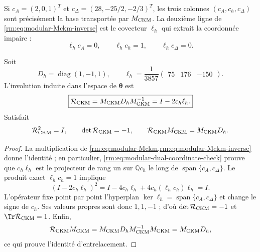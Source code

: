 Si \(c_A=(2,0,1)^T\) et
\(c_\Delta=(28,-25/2,-2/3)^T\), les trois colonnes
\((c_A,c_h,c_\Delta)\) sont précisément la base transportée par
\(M_{\rm CKM}\). La deuxième ligne de
\cref{rm:eq:modular-Mckm-inverse} est le covecteur \(\ell_h\) qui extrait la
coordonnée impaire :
\begin{equation}
\label{rm:eq:modular-dual-coordinate-check}
\ell_hc_A=0,
\qquad
\ell_hc_h=1,
\qquad
\ell_hc_\Delta=0.
\end{equation}

\begin{theorem}
\label{rm:thm:modular-ckm-reflection}
Soit
\begin{equation}
\label{rm:eq:modular-Dh-lh}
D_h=\operatorname{diag}(1,-1,1),
\qquad
\ell_h=\frac1{3857}\begin{pmatrix}75&176&-150\end{pmatrix}.
\end{equation}
L'involution induite dans l'espace de \(\boldsymbol\theta\) est
\begin{equation}
\label{rm:eq:modular-Rckm}
\boxed{
\mathcal R_{\rm CKM}
=M_{\rm CKM}D_hM_{\rm CKM}^{-1}
=I-2c_h\ell_h.}
\end{equation}
Satisfait
\begin{equation}
\label{rm:eq:modular-Rckm-properties}
\mathcal R_{\rm CKM}^2=I,
\qquad
\det\mathcal R_{\rm CKM}=-1,
\qquad
\mathcal R_{\rm CKM}M_{\rm CKM}=M_{\rm CKM}D_h.
\end{equation}
\end{theorem}

\begin{proof}
La multiplication de
\cref{rm:eq:modular-Mckm,rm:eq:modular-Mckm-inverse} donne l'identité ; en
particulier, \cref{rm:eq:modular-dual-coordinate-check} prouve que
\(c_h\ell_h\) est le projecteur de rang un sur \(\mathbb Qc_h\) le
long de \(\operatorname{span}\{c_A,c_\Delta\}\). Le produit exact
\(\ell_hc_h=1\) implique
\[
(I-2c_h\ell_h)^2
=I-4c_h\ell_h+4c_h(\ell_hc_h)\ell_h=I.
\]
L'opérateur fixe point par point l'hyperplan
\(\ker\ell_h=\operatorname{span}\{c_A,c_\Delta\}\) et change le signe de
\(c_h\). Ses valeurs propres sont donc \(1,1,-1\) ; d'où
\(\det\mathcal R_{\rm CKM}=-1\) et
\(\Tr\mathcal R_{\rm CKM}=1\). Enfin,
\[
\mathcal R_{\rm CKM}M_{\rm CKM}
=M_{\rm CKM}D_hM_{\rm CKM}^{-1}M_{\rm CKM}
=M_{\rm CKM}D_h,
\]
ce qui prouve l'identité d'entrelacement.
\end{proof}

